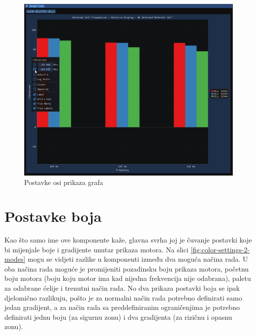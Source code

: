 \documentclass[times, utf8, diplomski]{fer}
\begin{document}
\begin{figure} [H]
	\centering
    \includegraphics[width=\textwidth]{graph_view_axis_settings.png}
    \caption{Postavke osi prikaza grafa}
    \label{fig:graph-axis-settings}
\end{figure}

\section{Postavke boja} \label{color-settings-section}
Kao što samo ime ove komponente kaže, glavna svrha joj je čuvanje postavki koje bi mijenjale boje i gradijente unutar prikaza motora. Na slici \ref{fig:color-settings-2-modes} mogu se vidjeti razlike u komponenti između dva moguća načina rada. U oba načina rada moguće je promijeniti pozadinsku boju prikaza motora, početnu boju motora (boju koju motor ima kad nijedna frekvencija nije odabrana), paletu za odabrane ćelije i trenutni način rada. No dva prikaza postavki boja se ipak djelomično razlikuju, pošto je za normalni način rada potrebno definirati samo jedan gradijent, a za način rada sa preddefiniranim ograničenjima je potrebno definirati jednu boju (za sigurnu zonu) i dva gradijenta (za rizičnu i opasnu zonu).
\end{document}
